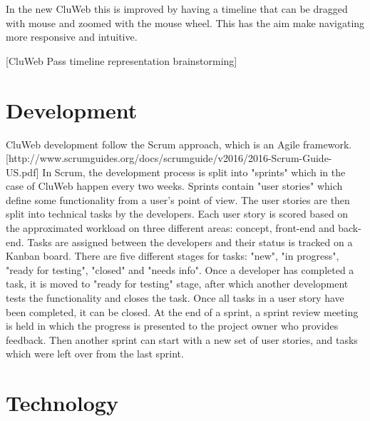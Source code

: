 In the new CluWeb this is improved by having a timeline that can be dragged with mouse and zoomed with the mouse wheel. This has the aim make navigating more responsive and intuitive.



[CluWeb Pass timeline representation brainstorming]

\section{Development}
CluWeb development follow the Scrum approach, which is an Agile framework. [http://www.scrumguides.org/docs/scrumguide/v2016/2016-Scrum-Guide-US.pdf]
In Scrum, the development process is split into "sprints" which in the case of CluWeb happen every two weeks. Sprints contain "user stories" which define some functionality from a user's point of view. The user stories are then split into technical tasks by the developers. Each user story is scored based on the approximated workload on three different areas: concept, front-end and back-end.
Tasks are assigned between the developers and their status is tracked on a Kanban board. There are five different stages for tasks: "new", "in progress", "ready for testing", "closed" and "needs info". Once a developer has completed a task, it is moved to "ready for testing" stage, after which another development tests the functionality and closes the task. Once all tasks in a user story have been completed, it can be closed.
At the end of a sprint, a sprint review meeting is held in which the progress is presented to the project owner who provides feedback. Then another sprint can start with a new set of user stories, and tasks which were left over from the last sprint.

\section{Technology}

